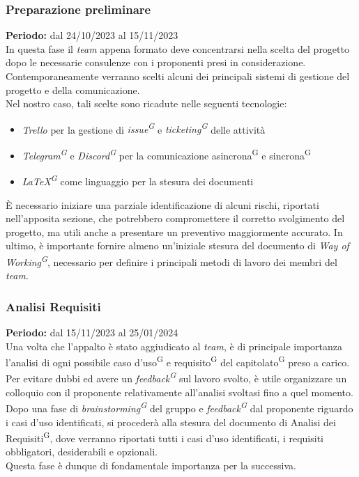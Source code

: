\documentclass[5pt]{article}
\begin{document}
\subsubsection{Preparazione preliminare}
\textbf{Periodo:} dal 24/10/2023 al 15/11/2023 
\vspace{0.3cm} \\
In questa fase il \textit{team} appena formato deve concentrarsi nella scelta del progetto dopo le necessarie consulenze con i proponenti presi in considerazione. \\
Contemporaneamente verranno scelti alcuni dei principali sistemi di gestione del progetto e della comunicazione. \\
Nel nostro caso, tali scelte sono ricadute nelle seguenti tecnologie: 
\begin{itemize}
  \item \textit{Trello} per la gestione di \textit{issue\textsuperscript{G}} e \textit{ticketing\textsuperscript{G}} delle attività
  \item \textit{Telegram\textsuperscript{G}} e \textit{Discord\textsuperscript{G}} per la comunicazione asincrona\textsuperscript{G} e sincrona\textsuperscript{G}
  \item \textit{\LaTeX\textsuperscript{G}} come linguaggio per la stesura dei documenti
\end{itemize}
È necessario iniziare una parziale identificazione di alcuni rischi, riportati nell'apposita sezione, che potrebbero compromettere il corretto svolgimento del progetto, 
ma utili anche a presentare un preventivo maggiormente accurato. 
In ultimo, è importante fornire almeno un'iniziale stesura del documento di \textit{Way of Working\textsuperscript{G}}, necessario per definire i principali metodi di lavoro dei membri del \textit{team}.
\subsubsection{Analisi Requisiti}
\textbf{Periodo:} dal 15/11/2023 al 25/01/2024 
\vspace{0.3cm} \\
Una volta che l'appalto è stato aggiudicato al \textit{team}, è di principale importanza l'analisi di ogni possibile caso d'uso\textsuperscript{G} e requisito\textsuperscript{G} del capitolato\textsuperscript{G} preso a carico.
Per evitare dubbi ed avere un \textit{feedback\textsuperscript{G}} sul lavoro svolto, è utile organizzare un colloquio con il proponente relativamente all'analisi svoltasi fino a quel momento. \\
Dopo una fase di \textit{brainstorming\textsuperscript{G}} del gruppo e \textit{feedback\textsuperscript{G}} dal proponente riguardo i casi d'uso identificati, si procederà alla stesura del documento di Analisi dei Requisiti\textsuperscript{G},
dove verranno riportati tutti i casi d'uso identificati, i requisiti obbligatori, desiderabili e opzionali. \\
Questa fase è dunque di fondamentale importanza per la successiva.
\end{document}
